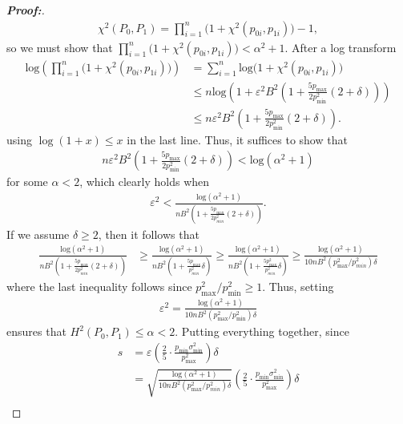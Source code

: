 \documentclass[11pt,twoside]{article}
\theoremstyle{definition}
\theoremstyle{remark}
\begin{document}
\begin{proof}[\textbf{Proof:}]
\begin{align*}
    \chi^2(P_0, P_1) = \prod^n_{i=1} \Big(1 + \chi^2(p_{0i}, p_{1i})\Big) - 1,
\end{align*}
so we must show that $\prod^n_{i=1} \Big(1 + \chi^2(p_{0i}, p_{1i})\Big) < \alpha^2 + 1$. After a log transform
\begin{align*}
   \text{log}\left( \prod^n_{i=1} \Big(1 + \chi^2(p_{0i}, p_{1i})\Big) \right) &= \sum^n_{i=1} \text{log}\Big(1 + \chi^2(p_{0i}, p_{1i})\Big) \\
   &\leq n \text{log}\left(1 + \varepsilon^2  B^2 \left(1 + \frac{5 p_{\max}}{2 p_{\min}^2} \left(2 + \delta  \right) \right)\right) \\
   &\leq n  \varepsilon^2  B^2 \left(1 + \frac{5 p_{\max}}{2 p_{\min}^2} \left(2 + \delta  \right) \right).
\end{align*}
using $\log(1+x) \leq x$ in the last line. 
Thus, it suffices to show that
\begin{align*}
    n  \varepsilon^2  B^2 \left(1 + \frac{5 p_{\max}}{2 p_{\min}^2} \left(2 + \delta  \right) \right) < \text{log}(\alpha^2 + 1)
\end{align*}
for some $\alpha < 2$, which clearly holds when
\begin{align*}
    \varepsilon^2 < \frac{\text{log}(\alpha^2 + 1)}{n  B^2 \left( 1 + \frac{5 p_{\max}}{2 p_{min}^2} (2+\delta) \right)}.
\end{align*}
If we assume $\delta \geq 2$, then it follows that
\begin{align*}
    \frac{\text{log}(\alpha^2 + 1)}{n  B^2 \left( 1 + \frac{5 p_{\max}}{2 p_{min}^2} (2+\delta) \right)} &\geq \frac{\text{log}(\alpha^2 + 1)}{n  B^2 \left( 1 + \frac{5 p_{\max}}{p_{min}^2} \delta  \right)} \geq \frac{\text{log}(\alpha^2 + 1)}{n  B^2 \left( 1 + \frac{5 p^2_{\max}}{ p_{min}^2} \delta  \right)} \geq \frac{\text{log}(\alpha^2 + 1)}{ 10 n  B^2 ( p^2_{\max} / p_{min}^2)\delta }
\end{align*}
where the last inequality follows since $p^2_{\max} / p^2_{\min} \geq 1$. Thus, setting
\begin{align*}
    \varepsilon^2 =\frac{\text{log}(\alpha^2 + 1)}{ 10 n  B^2 ( p^2_{\max} / p_{\min}^2 )\delta }
\end{align*}
ensures that $H^2(P_0, P_1) \leq \alpha < 2$. Putting everything together, since
\begin{align*}
    s &= \varepsilon \left( \frac{2}{5} \cdot  \frac{p_{\min} \sigma^2_{\min}}{p_{\max}^2} \right)  \delta \\
    &= \sqrt{\frac{\text{log}(\alpha^2 + 1)}{ 10 n  B^2 ( p^2_{\max} / p_{min}^2 )\delta }} \left( \frac{2}{5} \cdot \frac{p_{\min} \sigma^2_{\min}}{p_{\max}^2} \right) \delta  \\

\end{align*}
\end{proof}
\end{document}

